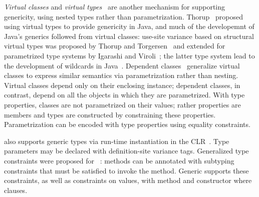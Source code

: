 \emph{Virtual classes} and \emph{virtual types}~\cite{beta,mp89-virtual-classes,ernst06-virtual}
are another mechanism for supporting genericity, using nested types
rather than parametrization.
Thorup~\cite{thorup97} proposed using virtual types to provide genericity in
Java, and much of the developemnt of Java's generics followed from virtual
classes:
use-site variance based on structural virtual types was proposed by
Thorup and Torgersen~\cite{unifying-genericity} and extended for
parametrized type systems by Igarashi and
Viroli~\cite{variant-parametric-types}; the latter type system lead
to the development of wildcards in Java~\cite{Java3,adding-wildcards,wildcards-safe}.
Dependent classes~\cite{dependent-classes} generalize virtual
classes to express similar semantics via parametrization rather
than nesting.  Virtual classes depend only on their enclosing
instance; dependent classes, in contrast, depend on all the
objects in which they are parametrized.  With type
properties, classes are not parametrized on their values;
rather properties are members and types are constructed by
constraining these properties.  Parametrization can be 
encoded with type properties using equality constraints.


\csharp also supports generic types via run-time instantiation in the
CLR~\cite{csharp-generics}.  Type parameters may be declared
with definition-site variance tags.
Generalized type constraints were proposed for
\csharp~\cite{emir06}: methods can be annotated with subtyping
constraints that must be satisfied to invoke the method.
Generic \Xten{} supports these constraints, as well as constraints
on values, with method and constructor where clauses.



